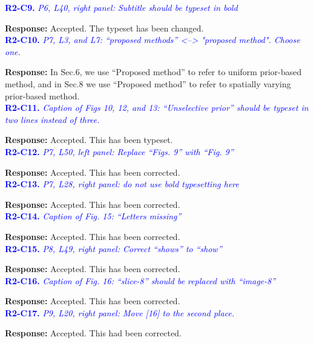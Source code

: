 \documentclass{article}
\begin{document}
 \textcolor{blue}{\textbf{R2-C9.}\textit{ P6, L40, right panel: Subtitle should be typeset in bold}}
 
  \textbf{Response:} Accepted. The typeset has been changed.\\

 \textcolor{blue}{\textbf{R2-C10.}\textit{ P7, L3, and L7: ``proposed methods'' <--> "proposed method". Choose one.}}
 
 \textbf{Response:} In Sec.6, we use ``Proposed method'' to refer to uniform prior-based method, and in Sec.8 we use ``Proposed method'' to refer to spatially varying prior-based method.\\

\textcolor{blue}{\textbf{R2-C11.}\textit{ Caption of Figs 10, 12, and 13: ``Unselective prior'' should be typeset in two lines instead of three.}}

  \textbf{Response:} Accepted. This has been typeset.\\

 \textcolor{blue}{\textbf{R2-C12.}\textit{ P7, L50, left panel: Replace ``Figs. 9'' with ``Fig. 9''}}
 
  \textbf{Response:} Accepted. This has been corrected.\\
 
 \textcolor{blue}{\textbf{R2-C13.}\textit{ P7, L28, right panel: do not use bold typesetting here}}
 
  \textbf{Response:} Accepted. This has been corrected.\\

 \textcolor{blue}{\textbf{R2-C14.}\textit{ Caption of Fig. 15: ``Letters missing''}}
 
  \textbf{Response:} Accepted. This has been corrected.\\

 \textcolor{blue}{\textbf{R2-C15.}\textit{ P8, L49, right panel: Correct ``shows'' to ``show''}}
 
 \textbf{Response:} Accepted. This has been corrected.\\

 \textcolor{blue}{\textbf{R2-C16.}\textit{ Caption of Fig. 16: ``slice-8'' should be replaced with ``image-8''}}
 
 \textbf{Response:} Accepted. This has been corrected.\\

 \textcolor{blue}{\textbf{R2-C17.}\textit{ P9, L20, right panel: Move [16] to the second place.   }}
 
 \textbf{Response:} Accepted. This had been corrected.\\
\end{document}

